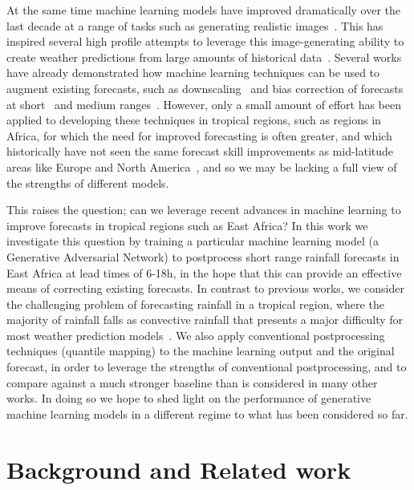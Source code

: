 \documentclass{article}
\begin{document}

At the same time machine learning models have improved dramatically over the last decade at a range of tasks such as generating realistic images~\citep{karras_style-based_2019}. This has inspired several high profile attempts to leverage this image-generating ability to create weather predictions from large amounts of historical data~\citep{nguyen_climax_2023, bi_pangu-weather_2022,ravuri_skilful_2021, zhang_skilful_2023,lam_graphcast_2022}. Several works have already demonstrated how machine learning techniques can be used to augment existing forecasts, such as downscaling~\citep{harris_generative_2022, leinonen_latent_2023} and bias correction of forecasts at short~\citep{rasp_neural_2018} and medium ranges~\citep{ben-bouallegue_improving_2023}. However, only a small amount of effort has been applied to developing these techniques in tropical regions, such as regions in Africa, for which the need for improved forecasting is often greater, and which historically have not seen the same forecast skill improvements as mid-latitude areas like Europe and North America~\citep{youds_gcrf_2021}, and so we may be lacking a full view of the strengths of different models.

This raises the question; can we leverage recent advances in machine learning to improve forecasts in tropical regions such as East Africa? In this work we investigate this question by training a particular machine learning model (a Generative Adversarial Network) to postprocess short range rainfall forecasts in East Africa at lead times of 6-18h, in the hope that this can provide an effective means of correcting existing forecasts. In contrast to previous works, we consider the challenging problem of forecasting rainfall in a tropical region, where the majority of rainfall falls as convective rainfall that presents a major difficulty for most weather prediction models~\citep{reynolds_wgne_2018}. We also apply conventional postprocessing techniques (quantile mapping) to the machine learning output and the original forecast, in order to leverage the strengths of conventional postprocessing, and to compare against a much stronger baseline than is considered in many other works. In doing so we hope to shed light on the performance of generative machine learning models in a different regime to what has been considered so far.

\section{Background and Related work}
\end{document}
